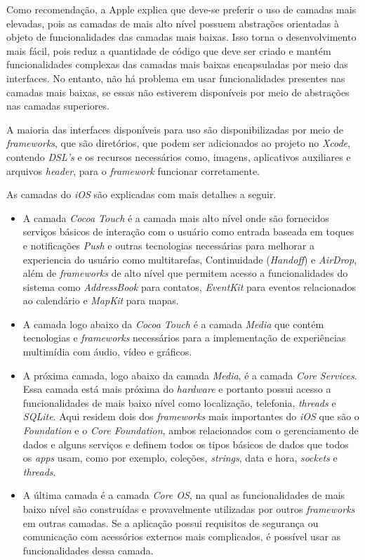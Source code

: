 Como recomendação, a Apple explica que deve-se preferir o uso de camadas mais elevadas, pois as camadas de 
mais alto nível possuem abstrações orientadas à objeto de funcionalidades das camadas mais baixas. Isso 
torna o desenvolvimento mais fácil, pois reduz a quantidade de código que deve ser criado e mantém funcionalidades 
complexas das camadas mais baixas encapsuladas por meio das interfaces. No entanto, não há problema em usar 
funcionalidades presentes nas camadas mais baixas, se essas não estiverem disponíveis por meio de abstrações nas 
camadas superiores. 

A maioria das interfaces disponíveis para uso são disponibilizadas por meio de \textit{frameworks}, 
que são diretórios, que podem ser adicionados ao projeto no \textit{Xcode}, contendo \textit{DSL's} e os recursos necessários como, 
imagens, aplicativos auxiliares e arquivos \textit{header}, para o \textit{framework} funcionar corretamente.

As camadas do \textit{iOS} são explicadas com mais detalhes a seguir. 
\begin{itemize}

	\item A camada \textit{Cocoa Touch} é a camada mais alto nível onde são fornecidos serviços básicos de interação 
    com o usuário como entrada baseada em toques e notificações \textit{Push} e outras tecnologias necessárias para
     melhorar a experiencia do usuário como multitarefas, Continuidade (\textit{Handoff}) e \textit{AirDrop}, além de \textit{frameworks} 
     de alto nível que permitem acesso a funcionalidades do sistema como \textit{AddressBook} para contatos, \textit{EventKit} 
     para eventos relacionados ao calendário e \textit{MapKit} para mapas.
	\item A camada logo abaixo da \textit{Cocoa Touch} é a camada \textit{Media} que contém tecnologias e \textit{frameworks} necessários 
    para a implementação de experiências multimídia com áudio, vídeo e gráficos.
	\item A próxima camada, logo abaixo da camada \textit{Media}, é a camada \textit{Core Services}. Essa camada está mais próxima 
    do \textit{hardware} e portanto possui acesso a funcionalidades de mais baixo nível como localização, telefonia, \textit{threads} 
    e \textit{SQLite}. Aqui residem dois dos \textit{frameworks} mais importantes do \textit{iOS} que são o \textit{Foundation} e o \textit{Core Foundation}, 
    ambos relacionados com o gerenciamento de dados e alguns serviços e definem todos os tipos básicos de dados que 
    todos os \textit{apps} usam, como por exemplo, coleções, \textit{strings}, data e hora, \textit{sockets} e \textit{threads}.
	\item A última camada é a camada \textit{Core OS}, na qual as funcionalidades de mais baixo nível são construídas e 
    provavelmente utilizadas por outros \textit{frameworks} em outras camadas. Se a aplicação possui requisitos de segurança 
    ou comunicação com acessórios externos mais complicados, é possível usar as funcionalidades dessa camada.
    
\end{itemize}

